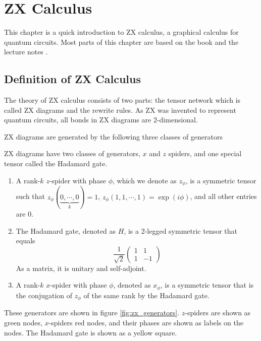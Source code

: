 \chapter{ZX Calculus} \label{ch:zx_calculus}

This chapter is a quick introduction to ZX calculus, a graphical calculus for quantum circuits.
Most parts of this chapter are based on the book \cite{KissingerWetering2024Book} and the lecture notes \cite{vandeweteringNotes}.

\section{Definition of ZX Calculus}

The theory of ZX calculus consists of two parts: the tensor network which is called ZX diagrams and the rewrite rules.
As ZX was invented to represent quantum circuits, all bonds in ZX diagrams are 2-dimensional.

ZX diagrams are generated by the following three classes of generators

\begin{definition}
ZX diagrams have two classes of generators, $x$ and $z$ spiders, and one special tensor called the Hadamard gate.
\begin{enumerate}
	\item A rank-$k$ $z$-spider with phase $\phi$, which we denote as $z_{\phi}$, is a symmetric tensor such that $z_{\phi}(\underbrace{0, \cdots, 0}_{k}) = 1$, $z_{\phi}(1, 1, \cdots, 1) = \exp(i \phi)$, and all other entries are $0$.
	\item The Hadamard gate, denoted as $H$, is a 2-legged symmetric tensor that equals 
		\begin{equation}
			\frac{1}{\sqrt{2}}\begin{pmatrix}
				1 & 1 \\ 1 & -1
			\end{pmatrix}
		\end{equation} \label{eq:hadamard}
		 As a matrix, it is unitary and self-adjoint.
	\item A rank-$k$ $x$-spider with phase $\phi$, denoted as $x_{\phi}$, is a symmetric tensor that is the conjugation of $z_{\phi}$ of the same rank by the Hadamard gate.
\end{enumerate}
\end{definition}

These generators are shown in figure \ref{fig:zx_generators}. 
$z$-spiders are shown as green nodes, $x$-spiders red nodes, and their phases are shown as labels on the nodes. 
The Hadamard gate is shown as a yellow square.

